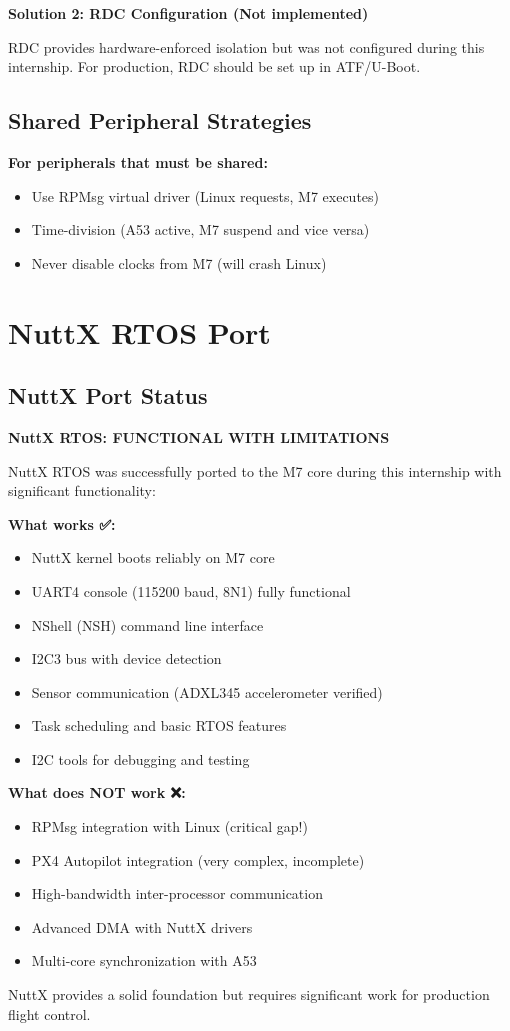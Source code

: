 \documentclass[12pt,a4paper]{report}
\begin{document}
\textbf{Solution 2: RDC Configuration (Not implemented)}

RDC provides hardware-enforced isolation but was not configured during this internship. For production, RDC should be set up in ATF/U-Boot.

\subsection{Shared Peripheral Strategies}

\textbf{For peripherals that must be shared:}
\begin{itemize}
    \item Use RPMsg virtual driver (Linux requests, M7 executes)
    \item Time-division (A53 active, M7 suspend and vice versa)
    \item Never disable clocks from M7 (will crash Linux)
\end{itemize}
\section{NuttX RTOS Port}

\subsection{NuttX Port Status}

\begin{important}
\textbf{NuttX RTOS: FUNCTIONAL WITH LIMITATIONS}

NuttX RTOS was successfully ported to the M7 core during this internship with significant functionality:

\textbf{What works ✅:}
\begin{itemize}
    \item NuttX kernel boots reliably on M7 core
    \item UART4 console (115200 baud, 8N1) fully functional
    \item NShell (NSH) command line interface
    \item I2C3 bus with device detection
    \item Sensor communication (ADXL345 accelerometer verified)
    \item Task scheduling and basic RTOS features
    \item I2C tools for debugging and testing
\end{itemize}

\textbf{What does NOT work ❌:}
\begin{itemize}
    \item RPMsg integration with Linux (critical gap!)
    \item PX4 Autopilot integration (very complex, incomplete)
    \item High-bandwidth inter-processor communication
    \item Advanced DMA with NuttX drivers
    \item Multi-core synchronization with A53
\end{itemize}

NuttX provides a solid foundation but requires significant work for production flight control.
\end{important}
\end{document}
